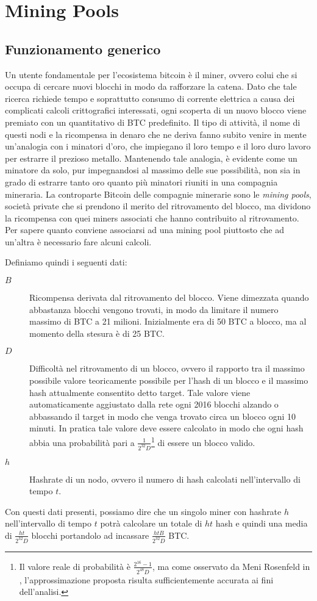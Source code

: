 \chapter{Mining Pools}\label{mining-pools}

\section{Funzionamento generico}

Un utente fondamentale per l'ecosistema bitcoin è il miner, ovvero colui che si occupa di cercare nuovi blocchi in modo da rafforzare la catena. Dato che tale ricerca richiede tempo e soprattutto consumo di corrente elettrica a causa dei complicati calcoli crittografici interessati, ogni scoperta di un nuovo blocco viene premiato con un quantitativo di BTC predefinito.
Il tipo di attività, il nome di questi nodi e la ricompensa in denaro che ne deriva fanno subito venire in mente un'analogia con i minatori d'oro, che impiegano il loro tempo e il loro duro lavoro per estrarre il prezioso metallo.
Mantenendo tale analogia, è evidente come un minatore da solo, pur impegnandosi al massimo delle sue possibilità, non sia in grado di estrarre tanto oro quanto più minatori riuniti in una compagnia mineraria. La controparte Bitcoin delle compagnie minerarie sono le \emph{mining pools}, società private che si prendono il merito del ritrovamento del blocco, ma dividono la ricompensa con quei miners associati che hanno contribuito al ritrovamento.
Per sapere quanto conviene associarsi ad una mining pool piuttosto che ad un'altra è necessario fare alcuni calcoli.

Definiamo quindi i seguenti dati:
\begin{description}
    \item[$B$] Ricompensa derivata dal ritrovamento del blocco. Viene dimezzata quando abbastanza blocchi vengono trovati, in modo da limitare il numero massimo di BTC a 21 milioni. Inizialmente era di 50 BTC a blocco, ma al momento della stesura è di 25 BTC.
    \item[$D$] Difficoltà nel ritrovamento di un blocco, ovvero il rapporto tra il massimo possibile valore teoricamente possibile per l'hash di un blocco e il massimo hash attualmente consentito detto target. Tale valore viene automaticamente aggiustato dalla rete ogni 2016 blocchi alzando o abbassando il target in modo che venga trovato circa un blocco ogni 10 minuti. In pratica tale valore deve essere calcolato in modo che ogni hash abbia una probabilità pari a $\frac{1}{2^{32} D}$\footnote{Il valore reale di probabilità è $\frac{2^{16} - 1}{2^{48} D}$, ma come osservato da Meni Rosenfeld in \cite{pool-analysis}, l'approssimazione proposta risulta sufficientemente accurata ai fini dell'analisi.} di essere un blocco valido.
    \item[$h$] Hashrate di un nodo, ovvero il numero di hash calcolati nell'intervallo di tempo $t$.
\end{description}
Con questi dati presenti, possiamo dire che un singolo miner con hashrate $h$ nell'intervallo di tempo $t$ potrà calcolare un totale di $ht$ hash e quindi una media di $\frac{ht}{2^{32}D}$ blocchi portandolo ad incassare $\frac{htB}{2^{32} D}$ BTC.

